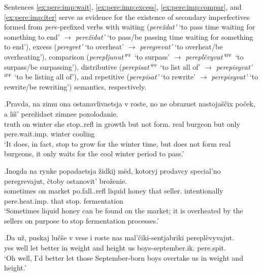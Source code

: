 Sentences \ref{ex:pere:imp:wait}, \ref{ex:pere:imp:excess}, \ref{ex:pere:imp:compar}, and \ref{ex:pere:imp:iter} serve as evidence for the existence of secondary imperfectives formed from \textit{pere-}prefixed verbs with waiting (\textit{pere\v{z}dat'} `to pass time waiting for something to end' $\rightarrow$ \textit{pere\v{z}idat'}  `to pass/be passing time waiting for something to end'), excess (\textit{peregret'} `to overheat' $\rightarrow$ \textit{peregrevat'} `to overheat/be overheating'), comparison (\textit{perepljunut'$^{\textsc{pf}}$} `to surpass' $\rightarrow$ \textit{perepl\"{e}vyvat'$^{\textsc{ipf}}$} `to surpass/be surpassing'), distributive (\textit{perepisat'$^{\textsc{pf}}$} `to list all of' $\rightarrow$ \textit{perepisyvat'$^{\textsc{ipf}}$} `to be listing all of'), and repetitive (\textit{perepisat'} `to rewrite' $\rightarrow$ \textit{perepisyvat'} `to rewrite/be rewriting') semantics, respectively.

\exg.\label{ex:pere:imp:wait}Pravda, na zimu ona ostanavlivaetsja v roste, no ne obrazuet nastoja\v{s}\v{c}ix po\v{c}ek, a li\v{s}' pere\v{z}idaet zimnee poxolodanie.\\
truth on winter she stop..refl in growth but not form. real burgeon but only pere.wait.imp. winter cooling\\
\trans `It does, in fact, stop to grow for the winter time, but does not form real burgeons, it only waits for the cool winter period to pass.'\\

\exg.\label{ex:pere:imp:excess}Inogda na rynke popadaetsja \v{z}idkij m\"{e}d, kotoryj prodavcy special'no peregrevajut, \v{c}toby ostanovit' bro\v{z}enie.\\
sometimes on market po.fall..refl liquid honey that seller. intentionally pere.heat.imp. that stop. fermentation\\
`Sometimes liquid honey can be found on the market; it is overheated by the sellers on purpose to stop fermentation processes.'\\

\exg.\label{ex:pere:imp:compar}Da u\v{z}, puskaj lu\v{c}\v{s}e v vese i roste nas mal'\v{c}iki-sentjabriki perepl\"{e}vyvajut.\\
yes well let better in weight and height us boys-september.ik. pere.spit.\\
\trans `Oh well, I'd better let those September-born boys overtake us in weight and height.'

